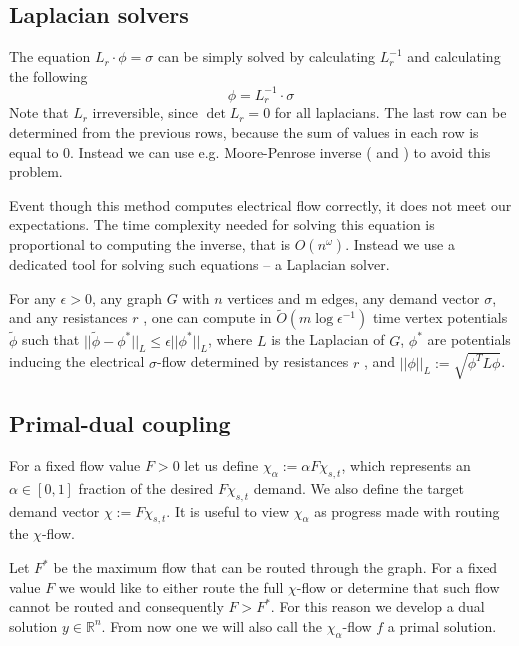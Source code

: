 \subsection{Laplacian solvers}
The equation $L_r \cdot \phi = \sigma$ can be simply solved by calculating $L_r^{-1}$ and calculating the following
\[ \phi = L_r^{-1} \cdot \sigma \]
Note that $L_r$ irreversible, since $\det L_r = 0$ for all laplacians. The last row can be determined from the previous rows, because the sum of values in each row is equal to $0$. Instead we can use e.g. Moore-Penrose inverse ( and ) to avoid this problem.

Event though this method computes electrical flow correctly, it does not meet our expectations. The time complexity needed for solving this equation is proportional to computing the inverse, that is $O(n^\omega)$. Instead we use a dedicated tool for solving such equations -- a Laplacian solver. 

\begin{theorem}
For any $\epsilon > 0$, any graph $G$ with $n$ vertices and m edges, any demand vector
$\sigma$, and any resistances $r$ , one can compute in $\tilde{O}(m \log \epsilon^{-1})$ time vertex potentials $\tilde{\phi}$ such that
$||\tilde{\phi} - \phi^*||_L \le \epsilon||\phi^*||_L$, where $L$ is the Laplacian of $G$, $\phi^*$ are potentials inducing the electrical $\sigma$-flow
determined by resistances $r$ , and $||\phi||_L := \sqrt{\phi^TL\phi}$.
\end{theorem}

\subsection{Primal-dual coupling}
For a fixed flow value $F>0$ let us define $\chi_\alpha := \alpha F\chi_{s,t}$, which represents an $\alpha \in [0,1]$ fraction of the desired $F\chi_{s,t}$ demand. We also define the target demand vector $\chi := F\chi_{s,t}$. It is useful to view $\chi_\alpha$ as progress made with routing the $\chi$-flow.

Let $F^*$ be the maximum flow that can be routed through the graph. For a fixed value $F$ we would like to either route the full $\chi$-flow or determine that such flow cannot be routed and consequently $F>F^*$. For this reason we develop a dual solution $y \in \mathbb{R}^n$. From now one we will also call the $\chi_\alpha$-flow $f$ a primal solution.

